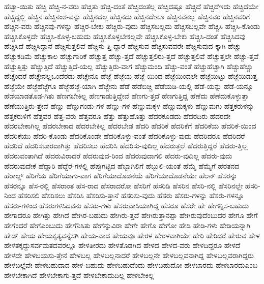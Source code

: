 {ಹೆಚ್ಚಾ-ಯಿತು
ಹೆಚ್ಚಿ
ಹೆಚ್ಚಿ-ನ-ವರು
ಹೆಚ್ಚಿತು
ಹೆಚ್ಚಿ-ದಂತೆ
ಹೆಚ್ಚಿದಂತೆಲ್ಲ
ಹೆಚ್ಚಿದಷ್ಟೂ
ಹೆಚ್ಚಿದೆ
ಹೆಚ್ಚಿದೆಇದು
ಹೆಚ್ಚಿದೆಯೇ
ಹೆಚ್ಚಿದ್ದಲ್ಲಿ
ಹೆಚ್ಚಿನ
ಹೆಚ್ಚಿನಂಶ-ವನ್ನು
ಹೆಚ್ಚಿನದಲ್ಲ
ಹೆಚ್ಚಿನದು
ಹೆಚ್ಚಿನದೇನೂ
ಹೆಚ್ಚಿನವನಲ್ಲ
ಹೆಚ್ಚಿನವರ
ಹೆಚ್ಚಿನವರಿಗೆ
ಹೆಚ್ಚಿನ-ವರು
ಹೆಚ್ಚಿನವು-ಗಳನ್ನು
ಹೆಚ್ಚಿರ-ಬೇಕು
ಹೆಚ್ಚಿರು-ವುದು
ಹೆಚ್ಚಿಸಬಲ್ಲದು
ಹೆಚ್ಚಿಸಬಲ್ಲವೇ
ಹೆಚ್ಚಿಸಿ
ಹೆಚ್ಚಿಸಿ-ಕೊಂಡು
ಹೆಚ್ಚಿಸಿಕೊಳ್ಳದೇ
ಹೆಚ್ಚಿಸಿ-ಕೊಳ್ಳ-ಬಹುದು
ಹೆಚ್ಚಿಸಿಕೊಳ್ಳಬೇಕಲ್ಲವೇ
ಹೆಚ್ಚಿಸಿಕೊಳ್ಳ-ಬೇಕು
ಹೆಚ್ಚಿಸಿ-ದಂತೆ
ಹೆಚ್ಚಿಸಿದವು
ಹೆಚ್ಚಿಸಿದೆ
ಹೆಚ್ಚಿಸಿದ್ದಾನೆ
ಹೆಚ್ಚಿಸುತ್ತಲಿವೆ
ಹೆಚ್ಚಿಸು-ತ್ತಿ-ದ್ದಾರೆ
ಹೆಚ್ಚಿಸುವ
ಹೆಚ್ಚಿಸುವವರೇ
ಹೆಚ್ಚಿಸುವುದ-ಕ್ಕಾಗಿ
ಹೆಚ್ಚು
ಹೆಚ್ಚುಕಡಿಮೆ
ಹೆಚ್ಚುಕಾಲ
ಹೆಚ್ಚುಗಾರಿಕೆ
ಹೆಚ್ಚುತ್ತ
ಹೆಚ್ಚು-ತ್ತದೆ
ಹೆಚ್ಚುತ್ತಲಿರು-ತ್ತದೆ
ಹೆಚ್ಚುತ್ತಲಿವೆ
ಹೆಚ್ಚುತ್ತಲೇ
ಹೆಚ್ಚು-ತ್ತವೆ
ಹೆಚ್ಚುತ್ತಿತ್ತು
ಹೆಚ್ಚುತ್ತಿದೆ
ಹೆಚ್ಚುತ್ತಿದೆ-ಯಲ್ಲ
ಹೆಚ್ಚುತ್ತಿರು-ವಾಗ
ಹೆಚ್ಚುಮಂದಿ
ಹೆಚ್ಚು-ವಂತೆ
ಹೆಚ್ಚುಹೆಚ್ಚಾಗಿ
ಹೆಚ್ಚುಹೆಚ್ಚು
ಹೆಚ್ಚೆಂದರೆ
ಹೆಚ್ಚೇನಲ್ಲಒಂದೆರಡು
ಹೆಚ್ಚೇನೂ
ಹೆಜ್ಜೆ
ಹೆಜ್ಜೆಯ
ಹೆಜ್ಜೆ-ಯಿಂದ
ಹೆಜ್ಜೆಯಿಂದಲೇ
ಹೆಜ್ಜೆಯಿಟ್ಟು
ಹೆಜ್ಜೆಯಿಡುತ್ತ
ಹೆಜ್ಜೆಯೇ
ಹೆಜ್ಜೆಹೆಜ್ಜೆಗೂ
ಹೆಜ್ಜೆಹೆಜ್ಜೆ-ಯಾಗಿ
ಹೆಜ್ಜೇನು
ಹೆಡೆ
ಹೆಡೆಬಿಚ್ಚಿ
ಹೆಡೆಯಡಿ-ಯಲ್ಲಿ
ಹೆಡೆ-ಯನ್ನು
ಹೆಡೆ-ಯನ್ನೂ
ಹೆಡೆಯಾಡತೊಡ-ಗಿತು
ಹೆಣಗಬೇಕಿಲ್ಲ
ಹೆಣಗಾಡುತ್ತಿದ್ದೇವೆ
ಹೆಣಗು-ತ್ತದೆ
ಹೆಣಗುತ್ತಿದ್ದ
ಹೆಣೆದು
ಹೆಣೆದುಕೊಳ್ಳುತ್ತಾ
ಹೆಣೆಯುತ್ತಿರು-ತ್ತೇವೆ
ಹೆಣ್ಣು
ಹೆಣ್ಣುಗಂಡು-ಗಳ
ಹೆಣ್ಣು-ಗಳ
ಹೆಣ್ಣುಮಕ್ಕಳ
ಹೆಣ್ಣುಮಕ್ಕಳು
ಹೆಣ್ಣುಮಗು
ಹೆತ್ತಕರುಳನ್ನು
ಹೆತ್ತಕರುಳಿಗೆ
ಹೆತ್ತವರ
ಹೆತ್ತ-ವರು
ಹೆತ್ತವರೂ
ಹೆತ್ತು
ಹೆತ್ತುಹೊತ್ತು
ಹೆದರಕೂಡದು
ಹೆದರದಿರು
ಹೆದರದೇ
ಹೆದರಬೇಕಾಗಿಲ್ಲ
ಹೆದರಬೇಕಾದ
ಹೆದರಬೇಕಿಲ್ಲ
ಹೆದರಬೇಡ
ಹೆದರಿ
ಹೆದರಿಕೆ
ಹೆದರಿಕೆಗೆ
ಹೆದರಿಕೆಯ
ಹೆದರಿಕೆ-ಯಿಂದ
ಹೆದರಿಕೆಯು
ಹೆದರಿ-ಕೊಂಡು
ಹೆದರಿಕೊಂಡೇ
ಹೆದರಿಕೊಳ್ಳು-ವಂತೆ
ಹೆದರಿಕೊಳ್ಳು-ವುದು
ಹೆದರಿದರೂ
ಹೆದರಿದರೆ
ಹೆದರಿದೆ
ಹೆದರಿಸಬಾರದಾಗಿತ್ತು
ಹೆದರಿಸಲು
ಹೆದರಿಸಿ
ಹೆದರಿಸು-ವುದಿಲ್ಲ
ಹೆದರುತ್ತಲೆ
ಹೆದರುತ್ತಿದ್ದರೆ
ಹೆದರು-ತ್ತಿಲ್ಲ
ಹೆದರುವಂತಾಗಿದೆ
ಹೆದರುವಿರಾದರೆ
ಹೆದರುವುದ-ರಿಂದ
ಹೆದರುವುದಾಗಲಿ
ಹೆದರು-ವುದಿಲ್ಲ
ಹೆದರು-ವುದು
ಹೆದರುವುದೇಕೆ
ಹೆದ್ದಾರಿ
ಹೆದ್ದೆರೆ-ಗಳಲ್ಲಿ
ಹೆಪ್ಪುಗಟ್ಟಿದ
ಹೆಬ್ಬಾಗಿಲಿಗೆ
ಹೆಬ್ಬುಲಿ-ಯಂತೆ
ಹೆಮ್ಮೆ
ಹೆಮ್ಮೆಗೆ
ಹೆರತನದ
ಹೆರಾಲ್ಡ್
ಹೆರಿಗೆಯ
ಹೆರಿಗೆಯಾಗು-ವಾಗ
ಹೆರಿಗೆಯಾದೊಡನೆಯೆ
ಹೆರಿಗೆಯಾದೊಡನೆಯೇ
ಹೆಲನ್
ಹೆಸರನ್ನು
ಹೆಸರನ್ನೂ
ಹೆಸ-ರಲ್ಲಿ
ಹೆಸರಾಂತ
ಹೆಸ-ರಾದ
ಹೆಸರಾದರೋ
ಹೆಸರಿಗೆ
ಹೆಸರಿಡಿ
ಹೆಸರಿನ
ಹೆಸರಿ-ನಲ್ಲಿ
ಹೆಸರಿನಲ್ಲೇ
ಹೆಸರಿ-ನಿಂದ
ಹೆಸರಿಸಲಿ
ಹೆಸರಿಸಲು
ಹೆಸರಿಸಿ
ಹೆಸರಿಸು-ತ್ತಾನೆ
ಹೆಸರಿಸು-ವುದು
ಹೆಸರು
ಹೆಸರು-ಗಳನ್ನು
ಹೆಸರು-ಗಳನ್ನೂ
ಹೆಸರು-ಗಳಿಂದ
ಹೆಸರುಗಳಿಸಿದವನು
ಹೆಸರು-ಗಳು
ಹೆಸರುವಾಸಿಯಾಗಿದ್ದ
ಹೆಸರೂ
ಹೆಸರೇ
ಹೇ
ಹೇಗನ್ನಿಸ-ಬಹುದು
ಹೇಗಾದರೂ
ಹೇಗಿತ್ತು
ಹೇಗಿದೆ
ಹೇಗಿರ-ಬಹುದು
ಹೇಗಿರು-ತ್ತದೆ
ಹೇಗಿರುತ್ತಾನಪ್ಪಾ
ಹೇಗಿರುವುದೆಂಬುದರ
ಹೇಗೂ
ಹೇಗೆ
ಹೇಗೆಂದರೆ
ಹೇಗೆಎಂಬುದು
ಹೇಗೆನಿಸಿತು
ಹೇಗೆನ್ನುವಿರಾ
ಹೇಗೇ
ಹೇಗೊ
ಹೇಗೋ
ಹೇಡಿ
ಹೇಡಿ-ಗಳು
ಹೇಡಿಯನ್ನಾಗಿ
ಹೇಡ್
ಹೇಯ
ಹೇಯಕೃತ್ಯವನ್ನೆಸಗಿ
ಹೇಯ-ವಾದ
ಹೇಯವೂ
ಹೇರಳ
ಹೇರಳವಾಗಿಯೇ
ಹೇರಿ
ಹೇರಿದರೆ
ಹೇರುವ
ಹೇಳ
ಹೇಳತಕ್ಕದ್ದುಸರ್ವಮತದವರಲ್ಲೂ
ಹೇಳತೀರದು
ಹೇಳತೊಡಗಿದ
ಹೇಳದ
ಹೇಳದ-ವರು
ಹೇಳದಿದ್ದರೂ
ಹೇಳದೆ
ಹೇಳದೇ
ಹೇಳಬಯಸು-ತ್ತೇನೆ
ಹೇಳಬಲ್ಲ
ಹೇಳಬಲ್ಲನಾದರೆ
ಹೇಳಬಲ್ಲನೇ
ಹೇಳಬಲ್ಲವನಾಗಿದ್ದ
ಹೇಳಬಲ್ಲವರಾಗಿದ್ದರು
ಹೇಳಬಲ್ಲೆವೇ
ಹೇಳಬಹುದಾದ
ಹೇಳ-ಬಹುದು
ಹೇಳಬಹುದೆಂದು
ಹೇಳಬಹುದೋ
ಹೇಳಬಾರದು
ಹೇಳಬಾರದುಎಂಬ
ಹೇಳಬೇಕಾಗಿದೆ
ಹೇಳಬೇಕಾಗು-ತ್ತದೆ
ಹೇಳಬೇಕಾದುದಿಲ್ಲ
ಹೇಳಬೇಕಿಲ್ಲ
}
